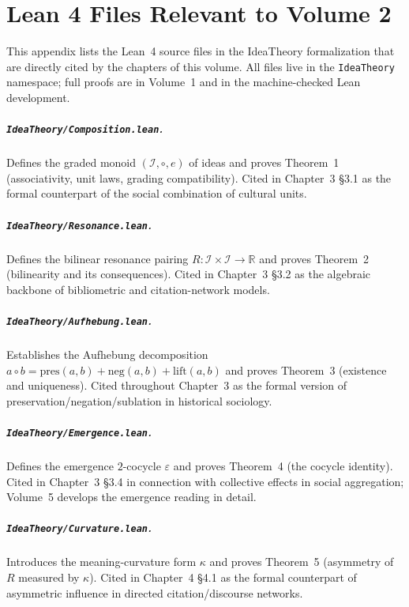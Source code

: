 \documentclass[11pt,oneside]{book}
\begin{document}



\appendix
\chapter{Lean 4 Files Relevant to Volume 2}

This appendix lists the Lean~4 source files in the IdeaTheory
formalization that are directly cited by the chapters of this volume.
All files live in the \texttt{IdeaTheory} namespace; full proofs are
in Volume~1 and in the machine-checked Lean development.

\paragraph{\texttt{IdeaTheory/Composition.lean}.}
Defines the graded monoid $(\mathcal{I},\circ,e)$ of ideas and proves
Theorem~1 (associativity, unit laws, grading compatibility). Cited in
Chapter~3 §3.1 as the formal counterpart of the social combination of
cultural units.

\paragraph{\texttt{IdeaTheory/Resonance.lean}.}
Defines the bilinear resonance pairing
$R\colon\mathcal{I}\times\mathcal{I}\to\mathbb{R}$ and proves
Theorem~2 (bilinearity and its consequences). Cited in Chapter~3 §3.2
as the algebraic backbone of bibliometric and citation-network
models.

\paragraph{\texttt{IdeaTheory/Aufhebung.lean}.}
Establishes the Aufhebung decomposition $a\circ b = \mathrm{pres}(a,b)
+ \mathrm{neg}(a,b) + \mathrm{lift}(a,b)$ and proves Theorem~3
(existence and uniqueness). Cited throughout Chapter~3 as the formal
version of preservation/negation/sublation in historical sociology.

\paragraph{\texttt{IdeaTheory/Emergence.lean}.}
Defines the emergence $2$-cocycle $\varepsilon$ and proves Theorem~4
(the cocycle identity). Cited in Chapter~3 §3.4 in connection with
collective effects in social aggregation; Volume~5 develops the
emergence reading in detail.

\paragraph{\texttt{IdeaTheory/Curvature.lean}.}
Introduces the meaning-curvature form $\kappa$ and proves Theorem~5
(asymmetry of $R$ measured by $\kappa$). Cited in Chapter~4 §4.1 as
the formal counterpart of asymmetric influence in directed
citation/discourse networks.
\end{document}
